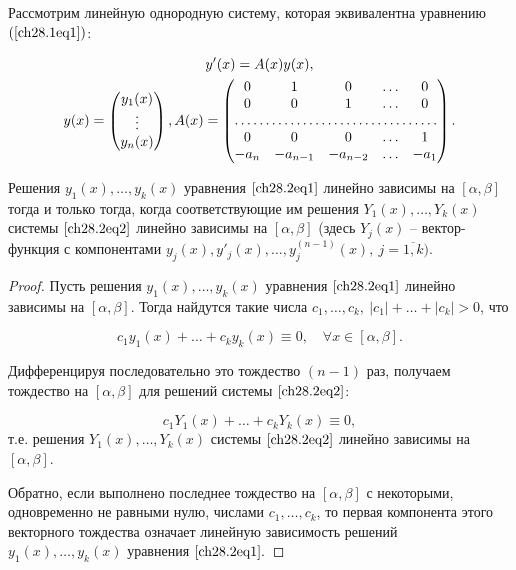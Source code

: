 Рассмотрим линейную однородную систему, которая эквивалентна уравнению $(\ref{ch28.1eq1})$:

\begin{multline} \label{ch28.2eq2}
y'(x) = A(x)y(x), \\
y(x) = \begin{pmatrix}
y_1(x) \\
\vdots \\
y_n(x)
\end{pmatrix},
A(x) = \begin{pmatrix}
0 & 1 & 0 & \ldots & 0 \\
0 & 0 & 1 & \ldots & 0 \\
\hdotsfor{5} \\
0 & 0 & 0 & \ldots & 1 \\
-a_n & -a_{n - 1} & -a_{n - 2} & \ldots & -a_1
\end{pmatrix}.
\end{multline}

\begin{lemm} \label{ch28.2lemm1}
Решения $y_1(x), \ldots, y_k(x)$ уравнения $\eqref{ch28.2eq1}$ линейно зависимы на $[\alpha, \beta]$ тогда и только тогда, когда соответствующие им решения $Y_1(x), \ldots, Y_k(x)$ системы $\eqref{ch28.2eq2}$ линейно зависимы на $[\alpha,\beta]$ (здесь $Y_j(x)$ -- вектор-функция с компонентами $y_j(x), y'_j(x), \ldots, y^{(n - 1)}_j(x), \: j = \overline{1,k})$.
\end{lemm}

\begin{proof}
Пусть решения $y_1(x), \ldots, y_k(x)$ уравнения $\eqref{ch28.2eq1}$ линейно зависимы на $[\alpha, \beta]$. Тогда найдутся такие числа $c_1, \ldots, c_k, \: |c_1| + \ldots + |c_k| > 0$, что 

$$
c_1y_1(x) + \ldots + c_ky_k(x) \equiv 0, \quad \forall x \in [\alpha, \beta].
$$

Дифференцируя последовательно это тождество $(n - 1)$ раз, получаем тождество на $[\alpha, \beta]$ для решений системы $\eqref{ch28.2eq2}$:

$$
c_1Y_1(x) + \ldots + c_kY_k(x) \equiv 0,
$$
т.е. решения $Y_1(x), \ldots, Y_k(x)$ системы $\eqref{ch28.2eq2}$ линейно зависимы на $[\alpha, \beta]$.

Обратно, если выполнено последнее тождество на $[\alpha, \beta]$ с некоторыми, одновременно не равными нулю, числами $c_1, \ldots, c_k$, то первая компонента этого векторного тождества означает линейную зависимость решений $y_1(x), \ldots, y_k(x)$ уравнения $\eqref{ch28.2eq1}.$
\end{proof}

